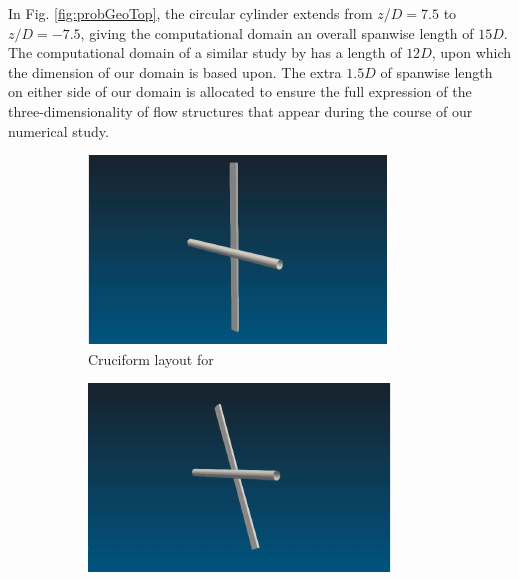 \documentclass[oneside]{utmthesis}
\begin{document}
In Fig. \ref{fig:probGeoTop}, the circular cylinder extends from $z/D=7.5$ to $z/D=-7.5$, giving the computational domain an overall spanwise length of $15D$. The computational domain of a similar study by \citet{Deng2007} has a length of $12D$, upon which the dimension of our domain is based upon. The extra $1.5D$ of spanwise length on either side of our domain is allocated to ensure the full expression of the three-dimensionality of flow structures that appear during the course of our numerical study.

\begin{figure}
  \centering
  \begin{subfigure}[h]{0.3\textwidth}
    \includegraphics[width=\textwidth]{figs/cruciform90}
    \caption{Cruciform layout for \angfi{}}
    \label{fig:cruciform90}
  \end{subfigure}
  \hfill
  \begin{subfigure}[h]{0.3\textwidth}
    \includegraphics[width=\textwidth]{figs/cruciform675}

\end{subfigure}
\end{figure}
\end{document}
